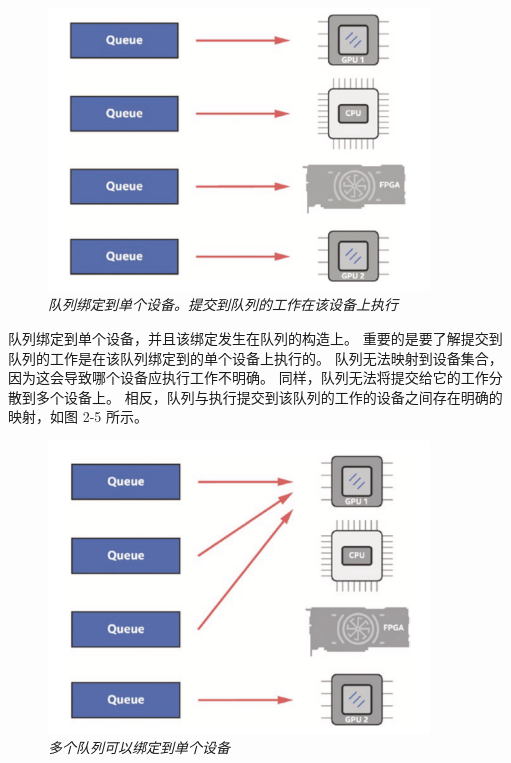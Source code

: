 \begin{figure}[H]
	\centering
	\includegraphics[width=0.9\textwidth]{figs/F2.5.png}
	\caption{\textit{队列绑定到单个设备。提交到队列的工作在该设备上执行}}
\end{figure}

队列绑定到单个设备，并且该绑定发生在队列的构造上。 重要的是要了解提交到队列的工作是在该队列绑定到的单个设备上执行的。 
队列无法映射到设备集合，因为这会导致哪个设备应执行工作不明确。 同样，队列无法将提交给它的工作分散到多个设备上。 
相反，队列与执行提交到该队列的工作的设备之间存在明确的映射，如图 2-5 所示。

\begin{figure}[H]
	\centering
	\includegraphics[width=0.9\textwidth]{figs/F2.6.png}
	\caption{\textit{多个队列可以绑定到单个设备}}
\end{figure}

